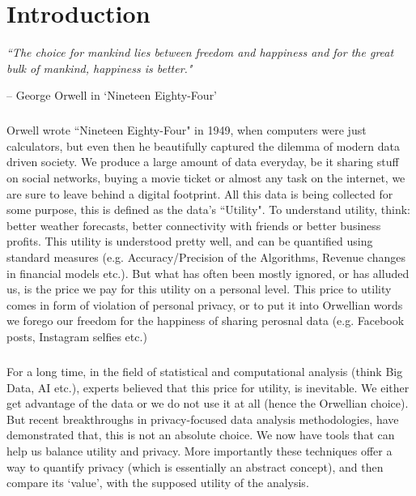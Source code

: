 \documentclass[12pt]{report}
\theoremstyle{named}
\begin{document}
\listoffigures
 
\listoftables
 
\newpage

\chapter{Introduction}


\textit{``The choice for mankind lies between freedom and happiness and for the great bulk of mankind, happiness is better."}

{\raggedleft -- George Orwell in `Nineteen Eighty-Four'\quad\par}

\paragraph{}
Orwell wrote ``Nineteen Eighty-Four" in 1949, when computers were just calculators, but even then he beautifully captured the dilemma of modern data driven society. We produce a large amount of data everyday, be it sharing stuff on social networks, buying a movie ticket or almost any task on the internet, we are sure to leave behind a digital footprint. All this data is being collected for some purpose, this is defined as the data's ``Utility". To understand utility, think: better weather forecasts, better connectivity with friends or better business profits. This utility is understood pretty well, and can be quantified using standard measures (e.g. Accuracy/Precision of the Algorithms, Revenue changes in financial models etc.). But what has often been mostly ignored, or has alluded us, is the price we pay for this utility on a personal level. This price to utility comes in form of violation of personal privacy, or to put it into Orwellian words we forego our freedom for the happiness of sharing perosnal data (e.g. Facebook posts, Instagram selfies etc.)
\paragraph{}
For a long time, in the field of statistical and computational analysis (think Big Data, AI etc.), experts believed that this price for utility, is inevitable. We either get advantage of the data or we do not use it at all (hence the Orwellian choice). But recent breakthroughs in privacy-focused data analysis methodologies, have demonstrated that, this is not an absolute choice. We now have tools that can help us balance utility and privacy. More importantly these techniques offer a way to quantify privacy (which is essentially an abstract concept), and then compare its `value', with the supposed utility of the analysis.
\end{document}
